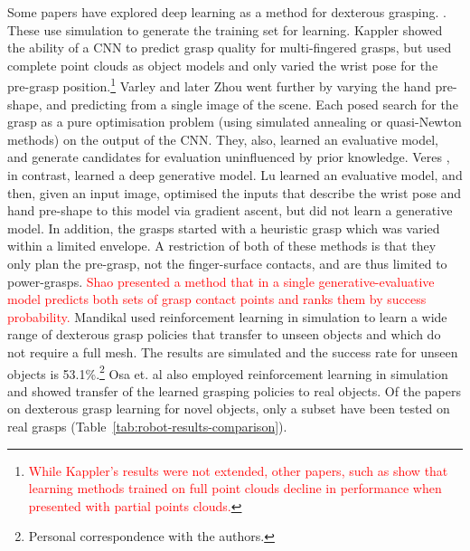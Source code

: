 Some papers have explored deep learning as a method for dexterous grasping. \cite{lu2017planning,varley2015generating,veres2017modeling,zhou20176dof,kappler2015leveraging}. These use simulation to generate the training set for learning. Kappler \cite{kappler2015leveraging} showed the ability of a CNN to predict grasp quality for multi-fingered grasps, but used complete point clouds as object models and only varied the wrist pose for the pre-grasp position.\footnote{\textcolor{red}{While Kappler's results were not extended, other papers, such as \cite{kopicki2015ijrr} show that learning methods trained on full point clouds decline in performance when presented with partial points clouds.}} Varley \cite{varley2015generating} and later Zhou \cite{zhou20176dof} went further by varying the hand pre-shape, and predicting from a single image of the scene. Each posed search for the grasp as a pure optimisation problem (using simulated annealing or quasi-Newton methods) on the output of the CNN. They, also, learned an evaluative model, and generate candidates for evaluation uninfluenced by prior knowledge. Veres \cite{veres2017modeling}, in contrast, learned a deep generative model. Lu \cite{lu2017planning} learned an evaluative model, and then, given an input image, optimised the inputs that describe the wrist pose and hand pre-shape to this model via gradient ascent, but did not learn a generative model. In addition, the grasps started with a heuristic grasp which was varied within a limited envelope. A restriction of both of these methods is that they only plan the pre-grasp, not the finger-surface contacts, and are thus limited to power-grasps. \textcolor{red}{Shao \cite{Shao2020} presented a method that in a single generative-evaluative model predicts both sets of grasp contact points and ranks them by success probability.} Mandikal \cite{mandikal2021dexterous} used reinforcement learning in simulation to learn a wide range of dexterous grasp policies that transfer to unseen objects and which do not require a full mesh. The results are simulated and the success rate for unseen objects is 53.1\%.\footnote{Personal correspondence with the authors.} Osa et. al \cite{Osa2018} also employed reinforcement learning in simulation and showed transfer of the learned grasping policies to real objects. Of the papers on dexterous grasp learning for novel objects, only a subset have been tested on real grasps (Table~\ref{tab:robot-results-comparison}). 

